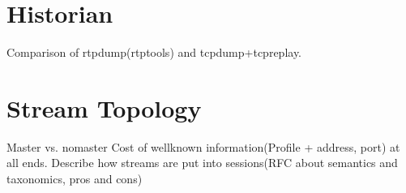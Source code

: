 \section{Historian}

Comparison of rtpdump(rtptools) and tcpdump+tcpreplay.

\begin{table}[H]
\centering
{}
\caption{My caption}
\label{my-label}
\end{table}
\section{Stream Topology}

Master vs. nomaster
Cost of wellknown information(Profile + address, port) at all ends.
Describe how streams are put into sessions(RFC about semantics and taxonomics, pros and cons)

